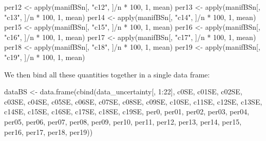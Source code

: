\documentclass[
]{book}
\newenvironment{Shaded}{\begin{snugshade}}{\end{snugshade}}
\newcommand{\DecValTok}[1]{\textcolor[rgb]{0.00,0.00,0.81}{#1}}
\newcommand{\FunctionTok}[1]{\textcolor[rgb]{0.00,0.00,0.00}{#1}}
\newcommand{\NormalTok}[1]{#1}
\newcommand{\OtherTok}[1]{\textcolor[rgb]{0.56,0.35,0.01}{#1}}
\newcommand{\SpecialCharTok}[1]{\textcolor[rgb]{0.00,0.00,0.00}{#1}}
\newcommand{\StringTok}[1]{\textcolor[rgb]{0.31,0.60,0.02}{#1}}
\begin{document}
\begin{Shaded}
\begin{Highlighting}[]
\NormalTok{per12 }\OtherTok{\textless{}{-}} \FunctionTok{apply}\NormalTok{(manifBSn[, }\StringTok{"c12"}\NormalTok{, ]}\SpecialCharTok{/}\NormalTok{n }\SpecialCharTok{*} \DecValTok{100}\NormalTok{, }\DecValTok{1}\NormalTok{, mean)}
\NormalTok{per13 }\OtherTok{\textless{}{-}} \FunctionTok{apply}\NormalTok{(manifBSn[, }\StringTok{"c13"}\NormalTok{, ]}\SpecialCharTok{/}\NormalTok{n }\SpecialCharTok{*} \DecValTok{100}\NormalTok{, }\DecValTok{1}\NormalTok{, mean)}
\NormalTok{per14 }\OtherTok{\textless{}{-}} \FunctionTok{apply}\NormalTok{(manifBSn[, }\StringTok{"c14"}\NormalTok{, ]}\SpecialCharTok{/}\NormalTok{n }\SpecialCharTok{*} \DecValTok{100}\NormalTok{, }\DecValTok{1}\NormalTok{, mean)}
\NormalTok{per15 }\OtherTok{\textless{}{-}} \FunctionTok{apply}\NormalTok{(manifBSn[, }\StringTok{"c15"}\NormalTok{, ]}\SpecialCharTok{/}\NormalTok{n }\SpecialCharTok{*} \DecValTok{100}\NormalTok{, }\DecValTok{1}\NormalTok{, mean)}
\NormalTok{per16 }\OtherTok{\textless{}{-}} \FunctionTok{apply}\NormalTok{(manifBSn[, }\StringTok{"c16"}\NormalTok{, ]}\SpecialCharTok{/}\NormalTok{n }\SpecialCharTok{*} \DecValTok{100}\NormalTok{, }\DecValTok{1}\NormalTok{, mean)}
\NormalTok{per17 }\OtherTok{\textless{}{-}} \FunctionTok{apply}\NormalTok{(manifBSn[, }\StringTok{"c17"}\NormalTok{, ]}\SpecialCharTok{/}\NormalTok{n }\SpecialCharTok{*} \DecValTok{100}\NormalTok{, }\DecValTok{1}\NormalTok{, mean)}
\NormalTok{per18 }\OtherTok{\textless{}{-}} \FunctionTok{apply}\NormalTok{(manifBSn[, }\StringTok{"c18"}\NormalTok{, ]}\SpecialCharTok{/}\NormalTok{n }\SpecialCharTok{*} \DecValTok{100}\NormalTok{, }\DecValTok{1}\NormalTok{, mean)}
\NormalTok{per19 }\OtherTok{\textless{}{-}} \FunctionTok{apply}\NormalTok{(manifBSn[, }\StringTok{"c19"}\NormalTok{, ]}\SpecialCharTok{/}\NormalTok{n }\SpecialCharTok{*} \DecValTok{100}\NormalTok{, }\DecValTok{1}\NormalTok{, mean)}
\end{Highlighting}
\end{Shaded}

We then bind all these quantities together in a single data frame:

\begin{Shaded}
\begin{Highlighting}[]
\NormalTok{dataBS }\OtherTok{\textless{}{-}} \FunctionTok{data.frame}\NormalTok{(}\FunctionTok{cbind}\NormalTok{(data\_uncertainty[, }\DecValTok{1}\SpecialCharTok{:}\DecValTok{22}\NormalTok{], c0SE, c01SE, }
\NormalTok{    c02SE, c03SE, c04SE, c05SE, c06SE, c07SE, c08SE, c09SE, c10SE, }
\NormalTok{    c11SE, c12SE, c13SE, c14SE, c15SE, c16SE, c17SE, c18SE, c19SE, }
\NormalTok{    per0, per01, per02, per03, per04, per05, per06, per07, per08, }
\NormalTok{    per09, per10, per11, per12, per13, per14, per15, per16, per17, }
\NormalTok{    per18, per19))}
\end{Highlighting}
\end{Shaded}
\end{document}
